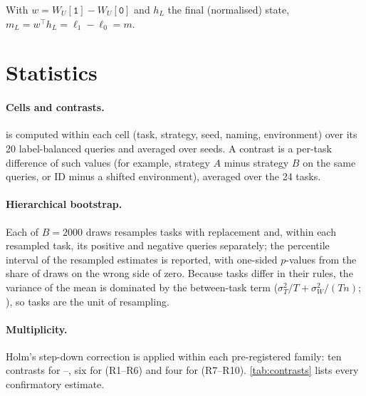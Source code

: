 \begin{lemma}
With $w = W_U[\texttt{1}] - W_U[\texttt{0}]$ and $h_L$ the final (normalised) state, $m_L = w^\top h_L = \ell_1 - \ell_0 = m$.
\end{lemma}

\section{Statistics}

\paragraph{Cells and contrasts.}
\AUROC is computed within each cell (task, strategy, seed, naming, environment) over its 20 label-balanced queries and averaged over seeds.
A contrast is a per-task difference of such values (for example, strategy $A$ minus strategy $B$ on the same queries, or ID minus a shifted environment), averaged over the 24 tasks.

\paragraph{Hierarchical bootstrap.}
Each of $B = 2000$ draws resamples tasks with replacement and, within each resampled task, its positive and negative queries separately; the percentile interval of the resampled estimates is reported, with one-sided $p$-values from the share of draws on the wrong side of zero.
Because tasks differ in their rules, the variance of the mean is dominated by the between-task term ($\sigma_T^2/T + \sigma_W^2/(Tn)$; \citealp{cochran1977sampling}), so tasks are the unit of resampling.

\paragraph{Multiplicity.}
Holm's step-down correction \citep{holm1979simple} is applied within each pre-registered family: ten contrasts for --, six for \sata (R1--R6) and four for \satami (R7--R10).
\autoref{tab:contrasts} lists every confirmatory estimate.

